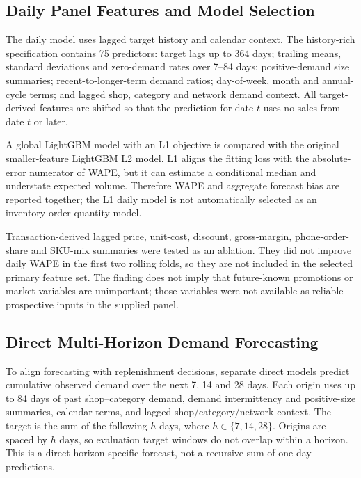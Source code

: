 \subsection{Daily Panel Features and Model Selection}

The daily model uses lagged target history and calendar context. The history-rich specification contains 75 predictors: target lags up to 364 days; trailing means, standard deviations and zero-demand rates over 7--84 days; positive-demand size summaries; recent-to-longer-term demand ratios; day-of-week, month and annual-cycle terms; and lagged shop, category and network demand context. All target-derived features are shifted so that the prediction for date \(t\) uses no sales from date \(t\) or later.

A global LightGBM model with an L1 objective is compared with the original smaller-feature LightGBM L2 model. L1 aligns the fitting loss with the absolute-error numerator of WAPE, but it can estimate a conditional median and understate expected volume. Therefore WAPE and aggregate forecast bias are reported together; the L1 daily model is not automatically selected as an inventory order-quantity model.

Transaction-derived lagged price, unit-cost, discount, gross-margin, phone-order-share and SKU-mix summaries were tested as an ablation. They did not improve daily WAPE in the first two rolling folds, so they are not included in the selected primary feature set. The finding does not imply that future-known promotions or market variables are unimportant; those variables were not available as reliable prospective inputs in the supplied panel.

\subsection{Direct Multi-Horizon Demand Forecasting}

To align forecasting with replenishment decisions, separate direct models predict cumulative observed demand over the next 7, 14 and 28 days. Each origin uses up to 84 days of past shop--category demand, demand intermittency and positive-size summaries, calendar terms, and lagged shop/category/network context. The target is the sum of the following \(h\) days, where \(h\in\{7,14,28\}\). Origins are spaced by \(h\) days, so evaluation target windows do not overlap within a horizon. This is a direct horizon-specific forecast, not a recursive sum of one-day predictions.

